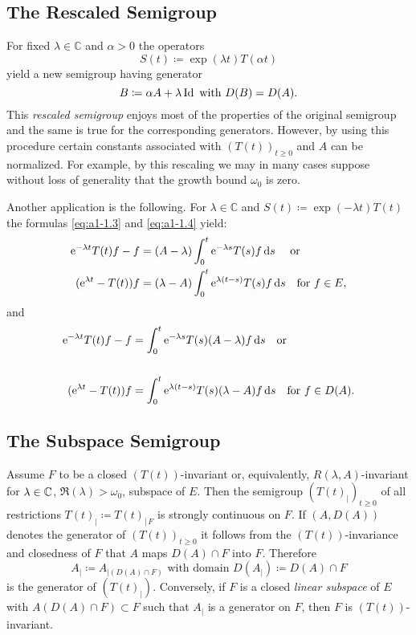 \subsection{The Rescaled Semigroup}\label{subsec:a1-3.2}%
For fixed $\lambda \in \mathbb{C}$ and $\alpha > 0$ the operators
\[
    S(t) \coloneqq \exp(\lambda t)T(\alpha t)
\]
yield a new semigroup having generator
\[
    B \coloneqq \alpha A + \lambda \operatorname{Id} \text{ with } D(B) = D(A) .
\]
This \emph{rescaled semigroup} enjoys most of the properties of the original semigroup and the same is true for the corresponding generators.
However, by using this procedure certain constants associated with $(T(t))_{t \geq 0}$ and $A$ can be normalized.
For example, by this rescaling we may in many cases suppose without loss of generality that the growth bound $\omega_{0}$ is zero.

Another application is the following.
For $\lambda \in \mathbb{C}$ and $S(t) \coloneqq \exp(-\lambda t)T(t)$ the formulas \eqref{eq:a1-1.3} and \eqref{eq:a1-1.4} yield:
\begin{align*}
     \mathrm{e}^{-\lambda t}T(t)f - f &= (A-\lambda) \int_{0}^{t}  \mathrm{e}^{-\lambda s}T(s)f \ds \quad\text{ or }\notag \\
    ( \mathrm{e}^{\lambda t}-T(t))f &= (\lambda-A) \int_{0}^{t}  \mathrm{e}^{\lambda(t-s)}T(s)f \ds \quad \text{for } f \in E, %
\end{align*}
and
\begin{align*}
     \mathrm{e}^{-\lambda t}T(t)f - f &= \int_{0}^{t}  \mathrm{e}^{-\lambda s}T(s)(A-\lambda)f \ds  \quad\text{or}\notag \\
    \notag \\
    ( \mathrm{e}^{\lambda t} - T(t))f &= \int_{0}^{t}  \mathrm{e}^{\lambda(t-s)}T(s)(\lambda-A)f \ds \quad \text{for } f \in D(A). %
\end{align*}
\subsection{The Subspace Semigroup}\label{subsec:a1-3.3}%
Assume $F$ to be a closed $(T(t))$-invariant or, equivalently, $R(\lambda,A)$-invariant for 
$\lambda \in \mathbb{C}$, 
$ \Re(\lambda) > \omega_{0}$, subspace of $E$.
Then the semigroup $(T(t)_{|})_{t \geq 0}$ of all restrictions $T(t)_{|} \coloneqq T(t)_{|\,F}$ is strongly continuous on $F$.
If $(A,D(A))$ denotes the generator of $(T(t))_{t \geq 0}$ it follows from the $(T(t))$-invariance and closedness of $F$ that $A$ maps $D(A) \cap F$ into $F$.
Therefore
\[
    A_{|} \coloneqq A_{| (D(A)\cap F)} \text{ with domain } D(A_{|}) \coloneqq D(A) \cap F
\]
is the generator of $(T(t)_{|})$.
%
Conversely, if $F$ is a closed \emph{linear subspace} of $E$ with $A(D(A) \cap F) \subset F$ such that 
$A_{|}$ is a generator on $F$, then $F$ is $(T(t))$-invariant.

